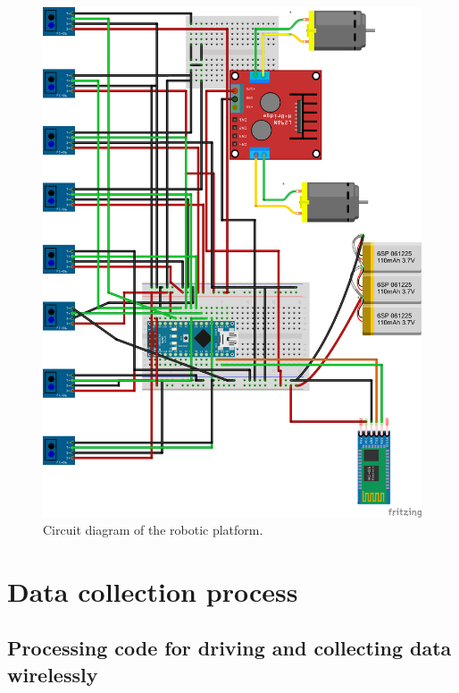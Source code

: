 \documentclass[14pt,a4paper]{extarticle}
\begin{document}
		\begin{figure}[H]
			\includegraphics[left, scale = 0.8]{ckt_diagram.png}
			\caption{Circuit diagram of the robotic platform.}
		\end{figure}
	
	
	\section{Data collection process}
	
	\subsection{Processing code for driving and collecting data wirelessly}
	
\end{document}
